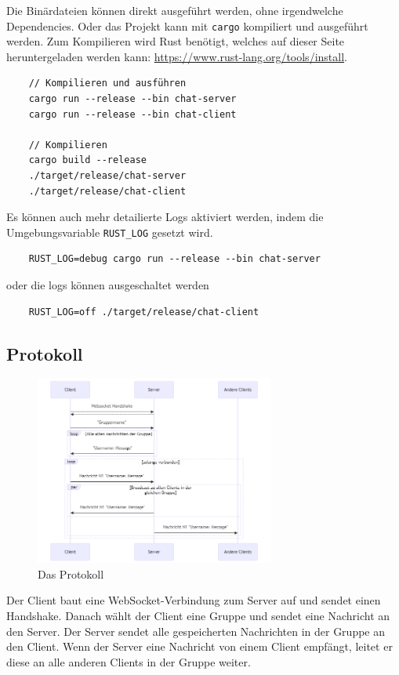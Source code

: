 \documentclass[a4paper]{article}
\begin{document}
Die Binärdateien können direkt ausgeführt werden, ohne irgendwelche Dependencies. Oder das Projekt kann mit \texttt{cargo} kompiliert und ausgeführt werden. Zum Kompilieren wird Rust benötigt, welches auf dieser Seite heruntergeladen werden kann: \url{https://www.rust-lang.org/tools/install}.
\begin{verbatim}    
    // Kompilieren und ausführen
    cargo run --release --bin chat-server
    cargo run --release --bin chat-client

    // Kompilieren
    cargo build --release
    ./target/release/chat-server
    ./target/release/chat-client
\end{verbatim}
Es können auch mehr detailierte Logs aktiviert werden, indem die Umgebungsvariable \texttt{RUST\_LOG} gesetzt wird.
\begin{verbatim}
    RUST_LOG=debug cargo run --release --bin chat-server 
\end{verbatim}
oder die logs können ausgeschaltet werden
\begin{verbatim}
    RUST_LOG=off ./target/release/chat-client
\end{verbatim}


\newpage
\subsection{Protokoll}

\begin{figure}[H]
    \centering
    \includegraphics[width=0.70\textwidth]{protocol2.png}
    \caption{Das Protokoll}\label{fig:protocol}
\end{figure}

Der Client baut eine WebSocket-Verbindung zum Server auf und sendet einen Handshake. Danach wählt der Client eine Gruppe und sendet eine Nachricht an den Server.
Der Server sendet alle gespeicherten Nachrichten in der Gruppe an den Client. Wenn der Server eine Nachricht von einem Client empfängt, leitet er diese an alle anderen Clients in der Gruppe weiter.
\end{document}
